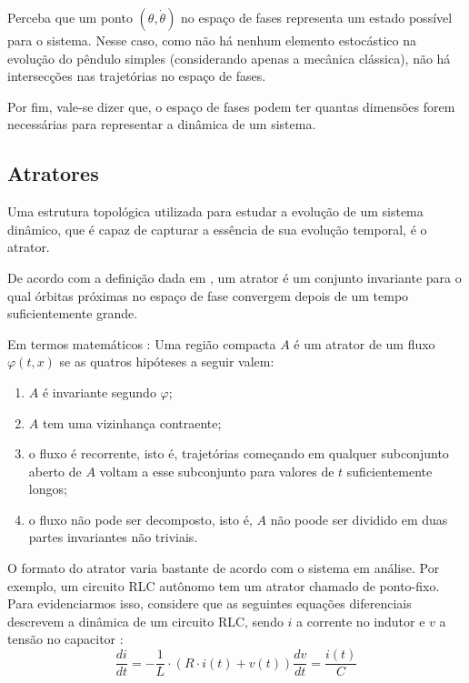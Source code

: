 \documentclass[a4paper, 12pt]{article}
\begin{document}
Perceba que um ponto $(\theta, \dot{\theta})$ no espaço de fases representa um estado possível para o sistema. Nesse caso, como não há nenhum elemento estocástico na evolução do pêndulo simples (considerando apenas a mecânica clássica), não há intersecções nas trajetórias no espaço de fases. 

Por fim, vale-se dizer que, o espaço de fases podem ter quantas dimensões forem necessárias para representar a dinâmica de um sistema. 

\subsection{Atratores}
Uma estrutura topológica utilizada para estudar a evolução de um sistema dinâmico, que é capaz de capturar a essência de sua evolução temporal, é o atrator.

De acordo com a definição dada em \cite{fiedler1994caos}, um atrator é um conjunto invariante para o qual órbitas próximas no espaço de fase convergem depois de um tempo suficientemente grande.

Em termos matemáticos \cite{fiedler1994caos}: Uma região compacta $A$ é um atrator de um fluxo $\varphi(t, x)$ se as quatros hipóteses a seguir valem:
\begin{enumerate}[label=\alph*)]
	\item $A$ é invariante segundo $\varphi$;
	\item $A$ tem uma vizinhança contraente;
	\item o fluxo é recorrente, isto é, trajetórias começando em qualquer subconjunto aberto de $A$ voltam a esse subconjunto para valores de $t$ suficientemente longos;
	\item o fluxo não pode ser decomposto, isto é, $A$ não poode ser dividido em duas partes invariantes não triviais.
\end{enumerate}

O formato do atrator varia bastante de acordo com o sistema em análise. Por exemplo, um circuito RLC autônomo tem um atrator chamado de ponto-fixo. Para evidenciarmos isso, considere que as seguintes equações diferenciais descrevem a dinâmica de um circuito RLC, sendo $i$ a corrente no indutor e $v$ a tensão no capacitor \cite{attux2001dinamica}:
\begin{subequations}
\begin{equation}
\frac{di}{dt} = - \frac{1}{L} \cdot (R\cdot i(t) + v(t))
\end{equation}
\begin{equation}
\frac{dv}{dt} = \frac{i(t)}{C}
\end{equation}
\end{subequations}
\end{document}
